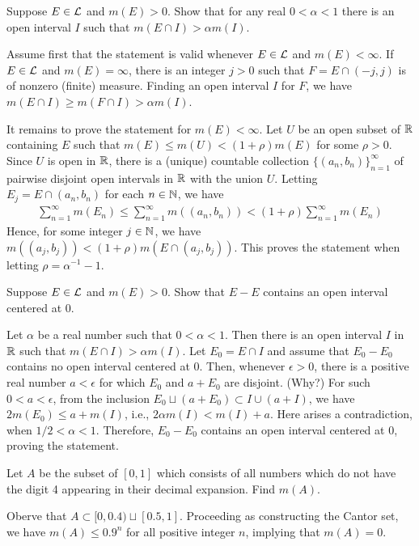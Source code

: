 \begin{prob}[Exercise 1.30]
    Suppose $E\in{\mathcal{L}}$ and $m(E)>0$.
    Show that for any real $0<\alpha<1$ there is an open interval $I$ such that $m(E\cap I)>\alpha m(I)$.
\end{prob}
\begin{sol}
    Assume first that the statement is valid whenever $E\in{\mathcal{L}}$ and $m(E)<\infty$.
    If $E\in{\mathcal{L}}$ and $m(E)=\infty$, there is an integer $j>0$ such that $F=E\cap(-j, j)$ is of nonzero (finite) measure.
    Finding an open interval $I$ for $F$, we have $m(E\cap I)\geq m(F\cap I)>\alpha m(I)$.

    It remains to prove the statement for $m(E)<\infty$.
    Let $U$ be an open subset of ${\mathbb{R}}$ containing $E$ such that $m(E)\leq m(U)<(1+\rho)m(E)$ for some $\rho>0$.
    Since $U$ is open in ${\mathbb{R}}$, there is a (unique) countable collection $\{(a_n, b_n)\}_{n=1}^\infty$ of pairwise disjoint open intervals in ${\mathbb{R}}$ with the union $U$.
    Letting $E_j=E\cap (a_n, b_n)$ for each $n\in{\mathbb{N}}$, we have
    \begin{align*}
        \sum_{n=1}^\infty m(E_n) \leq\sum_{n=1}^\infty m((a_n, b_n)) < (1+\rho)\sum_{n=1}^\infty m(E_n)
    \end{align*}
    Hence, for some integer $j\in{\mathbb{N}}$, we have $m((a_j, b_j))<(1+\rho)m(E\cap (a_j, b_j))$.
    This proves the statement when letting $\rho=\alpha^{-1}-1$.
\end{sol}

\begin{prob}[Exercise 1.31]
    Suppose $E\in{\mathcal{L}}$ and $m(E)>0$.
    Show that $E-E$ contains an open interval centered at 0.
\end{prob}
\begin{sol}
    Let $\alpha$ be a real number such that $0<\alpha<1$.
    Then there is an open interval $I$ in ${\mathbb{R}}$ such that $m(E\cap I)>\alpha m(I)$.
    Let $E_0=E\cap I$ and assume that $E_0-E_0$ contains no open interval centered at 0.
    Then, whenever $\epsilon>0$, there is a positive real number $a<\epsilon$ for which $E_0$ and $a+E_0$ are disjoint. \color{brown}(Why?) \color{black}
    For such $0<a<\epsilon$, from the inclusion $E_0\sqcup(a+E_0)\subset I\cup(a+I)$, we have $2m(E_0)\leq a+m(I)$, i.e., $2\alpha m(I)<m(I)+a$.
    Here arises a contradiction, when $1/2<\alpha<1$.
    Therefore, $E_0-E_0$ contains an open interval centered at 0, proving the statement.
\end{sol}

\begin{prob}
    Let $A$ be the subset of $[0, 1]$ which consists of all numbers which do not have the digit 4 appearing in their decimal expansion.
    Find $m(A)$.
\end{prob}
\begin{sol}
    Oberve that $A\subset[0, 0.4)\sqcup[0.5, 1]$.
    Proceeding as constructing the Cantor set, we have $m(A)\leq 0.9^n$ for all positive integer $n$, implying that $m(A)=0$.
\end{sol}